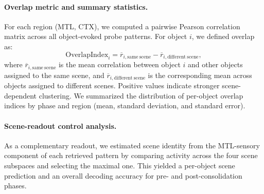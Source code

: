 \documentclass{article}
\begin{document}
\paragraph{Overlap metric and summary statistics.}
For each region (MTL, CTX), we computed a pairwise Pearson correlation matrix across all object-evoked probe patterns. For object $i$, we defined overlap as:
\begin{equation}
\mathrm{OverlapIndex}_i
=
\overline{r}_{i,\mathrm{same\ scene}}
-
\overline{r}_{i,\mathrm{different\ scene}},
\end{equation}
where $\overline{r}_{i,\mathrm{same\ scene}}$ is the mean correlation between object $i$ and other objects assigned to the same scene, and $\overline{r}_{i,\mathrm{different\ scene}}$ is the corresponding mean across objects assigned to different scenes. Positive values indicate stronger scene-dependent clustering. We summarized the distribution of per-object overlap indices by phase and region (mean, standard deviation, and standard error).

\paragraph{Scene-readout control analysis.}
As a complementary readout, we estimated scene identity from the MTL-sensory component of each retrieved pattern by comparing activity across the four scene subspaces and selecting the maximal one. This yielded a per-object scene prediction and an overall decoding accuracy for pre- and post-consolidation phases.
\end{document}

